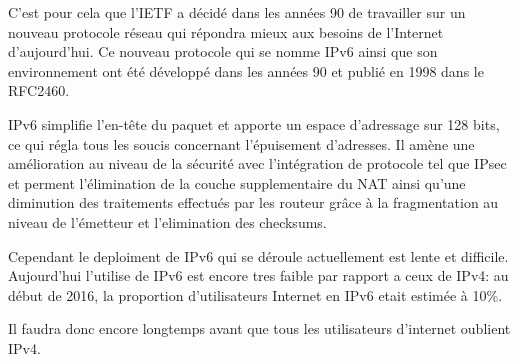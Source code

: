 \smallbreak
C'est pour cela que l'IETF a décidé dans les années 90 de travailler sur un
nouveau protocole réseau qui répondra mieux aux besoins de l'Internet
d'aujourd'hui. Ce nouveau protocole qui se nomme IPv6 ainsi que son
environnement ont été développé dans les années 90 et publié en 1998 dans le
RFC2460. 

\smallbreak
IPv6 simplifie l'en-tête du paquet et apporte un espace d'adressage sur 128
bits, ce qui régla tous les soucis concernant l'épuisement d'adresses.  Il
amène une amélioration au niveau de la sécurité avec l'intégration de protocole
tel que IPsec et perment l'élimination de la couche supplementaire du NAT ainsi
qu'une diminution des traitements effectués par les routeur grâce à la
fragmentation au niveau de l'émetteur et l'elimination des checksums.


Cependant le deploiment de IPv6 qui se déroule actuellement est lente et
difficile. Aujourd'hui l'utilise de IPv6 est encore tres faible par rapport a
ceux de IPv4: au début de 2016, la proportion d'utilisateurs Internet en IPv6
etait estimée à 10\%. 

\smallbreak

Il faudra donc encore longtemps avant que tous les utilisateurs d'internet
oublient IPv4.



